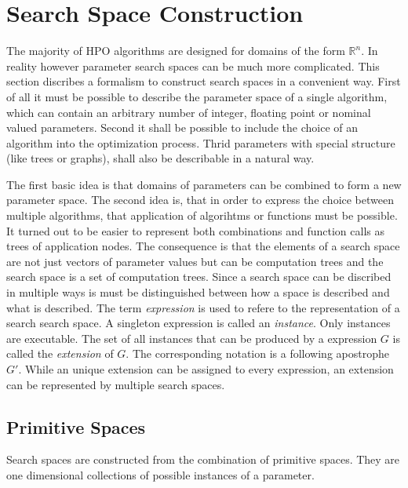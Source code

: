 \documentclass[english]{article}
\begin{document}
\newpage


\section{Search Space Construction}
The majority of \ac{HPO} algorithms are designed for domains of the form $\mathbb{R}^n$. In reality however parameter search spaces can be much more complicated. This section discribes a formalism to construct search spaces in a convenient way. First of all it must be possible to describe the parameter space of a single algorithm, which can contain an arbitrary number of integer, floating point or nominal valued parameters. Second it shall be possible to include the choice of an algorithm into the optimization process. Thrid parameters with special structure (like trees or graphs), shall also be describable in a natural way.

The first basic idea is that domains of parameters can be combined to form a new parameter space. The second idea is, that in order to express the choice between multiple algorithms, that application of algorihtms or functions must be possible. It turned out to be easier to represent both combinations and function calls as trees of application nodes.
The consequence is that the elements of a search space are not just vectors of parameter values but can be computation trees and the search space is a set of computation trees.
Since a search space can be discribed in multiple ways is must be distinguished between how a space is described and what is described. The term \textit{expression} is used to refere to the representation of a search search space. A singleton expression is called an \textit{instance}. Only instances are executable. The set of all instances that can be produced by a expression $G$ is called the \textit{extension} of $G$. The corresponding notation is a following apostrophe $G'$. While an unique extension can be assigned to every expression, an extension can be represented by multiple search spaces.

\subsection{Primitive Spaces}

Search spaces are constructed from the combination of primitive spaces. They are one dimensional collections of possible instances of a parameter.

\end{document}
